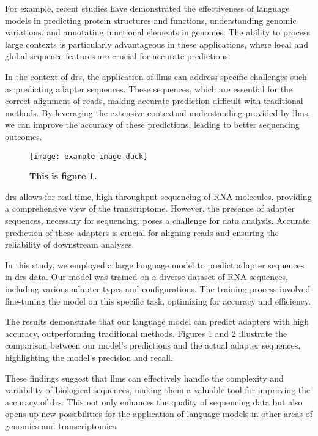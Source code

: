 \documentclass[pdflatex, sn-mathphys-num, lineno]{sn-jnl}%
\theoremstyle{thmstyleone}%
\theoremstyle{thmstyletwo}%
\theoremstyle{thmstylethree}%
\begin{document}
For example, recent studies have demonstrated the effectiveness of language models in predicting protein structures and functions, understanding genomic variations, and annotating functional elements in genomes.
The ability to process large contexts is particularly advantageous in these applications, where local and global sequence features are crucial for accurate predictions.

In the context of \gls{drs}, the application of \glspl{llm} can address specific challenges such as predicting adapter sequences.
These sequences, which are essential for the correct alignment of reads, making accurate prediction difficult with traditional methods. By leveraging the extensive contextual understanding provided by \glspl{llm}, we can improve the accuracy of these predictions, leading to better sequencing outcomes.


\begin{figure}[!h]
	\texttt{[image: example-image-duck]}
	\caption{\bf This is figure 1.}
	\label{fig:f1}
\end{figure}


\gls{drs} allows for real-time, high-throughput sequencing of RNA molecules, providing a comprehensive view of the transcriptome.
However, the presence of adapter sequences, necessary for sequencing, poses a challenge for data analysis.
Accurate prediction of these adapters is crucial for aligning reads and ensuring the reliability of downstream analyses.

In this study, we employed a large language model to predict adapter sequences in \gls{drs} data.
Our model was trained on a diverse dataset of RNA sequences, including various adapter types and configurations.
The training process involved fine-tuning the model on this specific task, optimizing for accuracy and efficiency.

The results demonstrate that our language model can predict adapters with high accuracy, outperforming traditional methods.
Figures 1 and 2 illustrate the comparison between our model's predictions and the actual adapter sequences, highlighting the model's precision and recall.

These findings suggest that \glspl{llm} can effectively handle the complexity and variability of biological sequences, making them a valuable tool for improving the accuracy of \gls{drs}.
This not only enhances the quality of sequencing data but also opens up new possibilities for the application of language models in other areas of genomics and transcriptomics.
\end{document}
